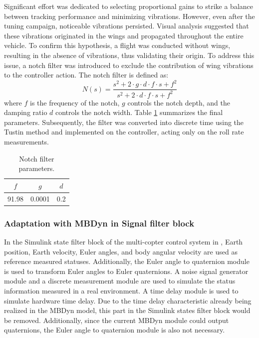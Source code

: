 Significant effort was dedicated to selecting proportional gains to strike a balance between tracking performance and minimizing vibrations. However, even after the tuning campaign, noticeable vibrations persisted. Visual analysis suggested that these vibrations originated in the wings and propagated throughout the entire vehicle. To confirm this hypothesis, a flight was conducted without wings, resulting in the absence of vibrations, thus validating their origin. To address this issue, a notch filter was introduced to exclude the contribution of wing vibrations to the controller action. The notch filter is defined as:
\begin{equation}
    N(s) = \frac{s^2 + 2 \cdot g \cdot d \cdot f \cdot s + f^2}{s^2 + 2 \cdot d \cdot f \cdot s + f^2}
\end{equation}
where \( f \) is the frequency of the notch, \( g \) controls the notch depth, and the damping ratio \( d \) controls the notch width. Table \ref{tab:filter_parameters} summarizes the final parameters. Subsequently, the filter was converted into discrete time using the Tustin method and implemented on the controller, acting only on the roll rate measurements. 

\begin{table}[h]
    \centering
    \begin{tabular}{ccc}
    \hline
        \(f\) & \(g\) & \(d\) \\
    \hline
        91.98 & 0.0001 & 0.2 \\
    \hline
    \end{tabular}
    \caption{Notch filter parameters.}
    \label{tab:filter_parameters}
\end{table}

\subsubsection{Adaptation with MBDyn in Signal filter block}
In the Simulink state filter block of the multi-copter control system in \cite{battaini2022}, Earth position, Earth velocity, Euler angles, and body angular velocity are used as reference measured statuses. Additionally, the Euler angle to quaternion module is used to transform Euler angles to Euler quaternions. A noise signal generator module and a discrete measurement module are used to simulate the status information measured in a real environment. A time delay module is used to simulate hardware time delay. Due to the time delay characteristic already being realized in the MBDyn model, this part in the Simulink states filter block would be removed. Additionally, since the current MBDyn module could output quaternions, the Euler angle to quaternion module is also not necessary.

